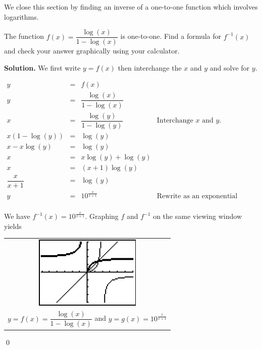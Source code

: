 \smallskip

We close this section by finding an inverse of a one-to-one function which involves logarithms.

\begin{ex}  \label{logfracinverse} The function $f(x) = \dfrac{\log(x)}{1-\log(x)}$ is one-to-one.  Find a formula for $f^{-1}(x)$ and check your answer graphically using your calculator.

{\bf Solution.}  We first write $y=f(x)$ then interchange the $x$ and $y$ and solve for $y$.

\[ \begin{array}{rclr}
y & = & f(x) & \\ 
y  & = & \dfrac{\log(x)}{1-\log(x)} & \\[8pt]
x  & = & \dfrac{\log(y)}{1-\log(y)} & \mbox{Interchange $x$ and $y$.}\\[8pt]
x\left(1-\log(y)\right) & = & \log(y) & \\ 
x - x\log(y)  & = & \log(y) & \\ 
x & = & x \log(y) + \log(y) & \\ 
x & = & (x+1) \log(y) & \\ 
\dfrac{x}{x+1}  & = & \log(y) & \\ 
y & = & 10^{\frac{x}{x+1}} & \mbox{Rewrite as an exponential equation.}\\

\end{array}\]

\pagebreak

We have $f^{-1}(x) = 10^{\frac{x}{x+1}}$.  Graphing $f$ and $f^{-1}$ on the same viewing window yields

\begin{center}
\begin{tabular}{c}

\includegraphics[width=2in]{./ExpLogsGraphics/LogEqns15.jpg} \\

$y = f(x) = \dfrac{\log(x)}{1-\log(x)}$ and \boldmath $y = g(x) = 10^{\frac{x}{x+1}}$ \\

\end{tabular}
\end{center}

\qed

\end{ex}

